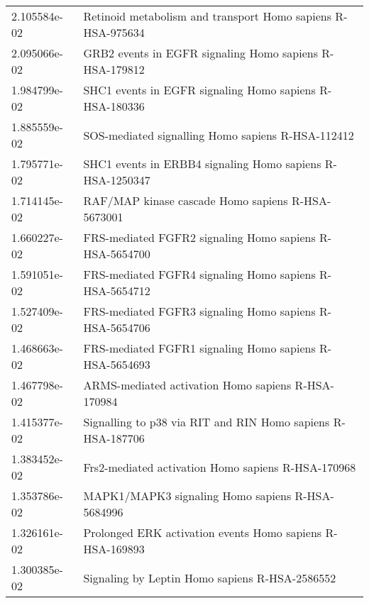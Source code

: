 \begin{longtable}{p{2.4cm}p{14.5cm}}
             2.105584e-02 &                                   Retinoid metabolism and transport Homo sapiens R-HSA-975634 \\
             2.095066e-02 &                                       GRB2 events in EGFR signaling Homo sapiens R-HSA-179812 \\
             1.984799e-02 &                                       SHC1 events in EGFR signaling Homo sapiens R-HSA-180336 \\
             1.885559e-02 &                                             SOS-mediated signalling Homo sapiens R-HSA-112412 \\
             1.795771e-02 &                                     SHC1 events in ERBB4 signaling Homo sapiens R-HSA-1250347 \\
             1.714145e-02 &                                             RAF/MAP kinase cascade Homo sapiens R-HSA-5673001 \\
             1.660227e-02 &                                       FRS-mediated FGFR2 signaling Homo sapiens R-HSA-5654700 \\
             1.591051e-02 &                                       FRS-mediated FGFR4 signaling Homo sapiens R-HSA-5654712 \\
             1.527409e-02 &                                       FRS-mediated FGFR3 signaling Homo sapiens R-HSA-5654706 \\
             1.468663e-02 &                                       FRS-mediated FGFR1 signaling Homo sapiens R-HSA-5654693 \\
             1.467798e-02 &                                            ARMS-mediated activation Homo sapiens R-HSA-170984 \\
             1.415377e-02 &                                   Signalling to p38 via RIT and RIN Homo sapiens R-HSA-187706 \\
             1.383452e-02 &                                            Frs2-mediated activation Homo sapiens R-HSA-170968 \\
             1.353786e-02 &                                              MAPK1/MAPK3 signaling Homo sapiens R-HSA-5684996 \\
             1.326161e-02 &                                     Prolonged ERK activation events Homo sapiens R-HSA-169893 \\
             1.300385e-02 &                                                Signaling by Leptin Homo sapiens R-HSA-2586552 \\

\end{longtable}
